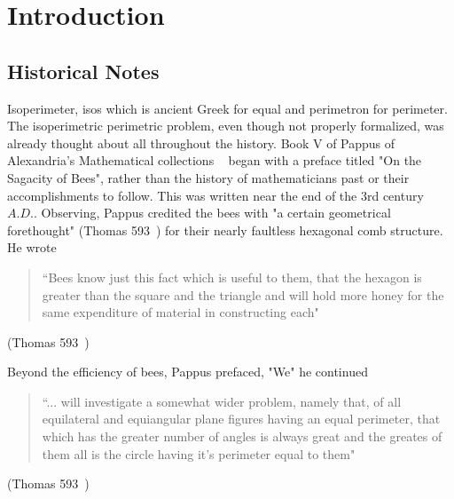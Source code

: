 \documentclass[a4paper]{book}
\begin{document}
\chapter{Introduction}
\section{Historical Notes}
Isoperimeter, isos which is ancient Greek for equal and perimetron for perimeter. The isoperimetric perimetric problem, even though not properly formalized, was already thought about all throughout the history. 
\newline
\newline
Book V of Pappus of Alexandria's Mathematical collections ~\cite{wiegert2010sagacity} began with a preface titled "On the Sagacity of Bees", rather than the history of mathematicians past or their accomplishments to follow. This was written near the end of the 3rd century $A.D.$. Observing, Pappus credited the bees with "a certain geometrical forethought" (Thomas 593~\cite{ivor1941selections}) for their nearly faultless hexagonal comb structure. He wrote
\begin{center}
    \begin{quote}
        ``Bees know just this fact which is useful to them, that 
        the hexagon is greater than the square and the triangle 
        and will hold more honey for the same expenditure of 
        material in constructing each"
    \end{quote}
    (Thomas 593~\cite{ivor1941selections})
\end{center}
Beyond the efficiency of bees, Pappus prefaced, "We" he continued
\begin{center}
    \begin{quote}
        ``... will {}investigate a somewhat wider problem, namely that, 
        of all equilateral and equiangular plane figures having an equal 
        perimeter, that which has the greater number of angles is always great 
        and the greates of them all is the circle having it's perimeter equal to them"
    \end{quote}
    (Thomas 593~\cite{ivor1941selections})
\end{center}
\end{document}
